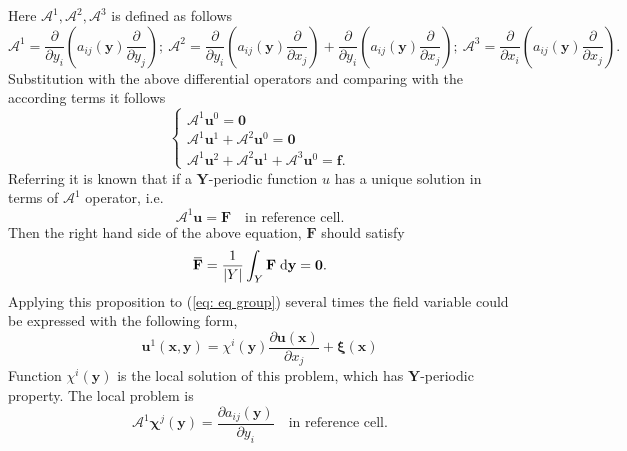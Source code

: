 Here $\mathcal{A}^{1}, \mathcal{A}^{2}, \mathcal{A}^{3}$ is defined as follows
\[
\mathcal{A}^{1} = \dfrac{\partial}{\partial y_{i}} \left( a_{ij}(\mathbf{y}) \dfrac{\partial}{\partial y_{j}} \right); \
\mathcal{A}^{2} = \dfrac{\partial}{\partial y_{i}} \left( a_{ij}(\mathbf{y}) \dfrac{\partial}{\partial x_{j}} \right) + \dfrac{\partial}{\partial y_{i}} \left( a_{ij}(\mathbf{y}) \dfrac{\partial}{\partial x_{j}} \right); \
\mathcal{A}^{3} = \dfrac{\partial}{\partial x_{i}} \left( a_{ij}(\mathbf{y}) \dfrac{\partial}{\partial x_{j}} \right).
\]
Substitution with the above differential operators and comparing with the according terms it follows
\begin{equation}
\label{eq: eq group}
\left\{
\begin{array}{l}
\mathcal{A}^{1} \mathbf{u}^{0} = \mathbf{0} \\
\mathcal{A}^{1} \mathbf{u}^{1} + \mathcal{A}^{2} \mathbf{u}^{0} = \mathbf{0} \\
\mathcal{A}^{1} \mathbf{u}^{2} + \mathcal{A}^{2} \mathbf{u}^{1} + \mathcal{A}^{3} \mathbf{u}^{0} = \mathbf{f}.
\end{array}
\right.
\end{equation}
Referring \citep{cioranescu2000introduction} it is known that if a $\mathbf{Y}$-periodic function $u$ has a unique solution in terms of $\mathcal{A}^{1}$ operator, i.e. 
\begin{equation}
\mathcal{A}^{1} \mathbf{u} = \mathbf{F} \quad \text{in reference cell}.
\end{equation}
Then the right hand side of the above equation, $\mathbf{F}$ should satisfy 
\begin{equation}
\overbar{\mathbf{F}} = \dfrac{1}{|Y|}\int_{Y} \mathbf{F} \myd{\mathbf{y}} = \mathbf{0}.
\end{equation}
Applying this proposition to (\ref{eq: eq group}) several times the field variable could be expressed with the following form,
\begin{equation}
\mathbf{u}^{1}(\mathbf{x}, \mathbf{y}) = \chi^{i}(\mathbf{y}) \dfrac{\partial \mathbf{u}(\mathbf{x})}{\partial x_{j}} + \mathbf{\xi} (\mathbf{x})
\end{equation}
Function $\chi^{i}(\mathbf{y})$ is the local solution of this problem, which has $\mathbf{Y}$-periodic property. The local problem is
\begin{equation}
\mathcal{A}^{1} \mathbf{\chi}^{j}(\mathbf{y}) = \dfrac{\partial a_{ij}(\mathbf{y})}{\partial y_{i}} \quad \text{in reference cell}.
\end{equation}
